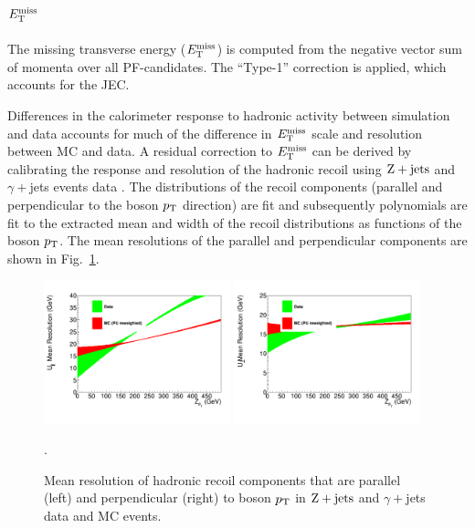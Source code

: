 \subsection{\texorpdfstring{$E_\mathrm{T}^{\mathrm{miss}}$}{MET}}
\label{subsec:obj_met}

The missing transverse energy ($E_\mathrm{T}^{\mathrm{miss}}$) is computed from the negative vector sum of momenta over all PF-candidates. The ``Type-1'' correction is applied, which accounts for the JEC.

Differences in the calorimeter response to hadronic activity between simulation and data accounts for much of the difference in $E_\mathrm{T}^{\mathrm{miss}}$ scale and resolution between MC and data. A residual correction to $E_\mathrm{T}^{\mathrm{miss}}$ can be derived by calibrating the response and resolution of the hadronic recoil using $\mathrm{Z+jets}$ and $\gamma+$jets events data \cite{recoil}. The distributions of the recoil components (parallel and perpendicular to the boson $p_\mathrm{T}$ direction) are fit and subsequently polynomials are fit to the extracted mean and width of the recoil distributions as functions of the boson $p_\mathrm{T}$. The mean resolutions of the parallel and perpendicular components are shown in Fig.~\ref{fig:met_MR}.


\begin{figure}[htbp]
\centering
\includegraphics[width=0.48\textwidth]{figures/u1MR.pdf}
\includegraphics[width=0.48\textwidth]{figures/u2MR.pdf}
\caption{Mean resolution of hadronic recoil components that are parallel (left) and perpendicular (right) to boson $p_\mathrm{T}$ in $\mathrm{Z+jets}$ and $\gamma+$jets data and MC events.}
\label{fig:met_MR}.
\end{figure}


